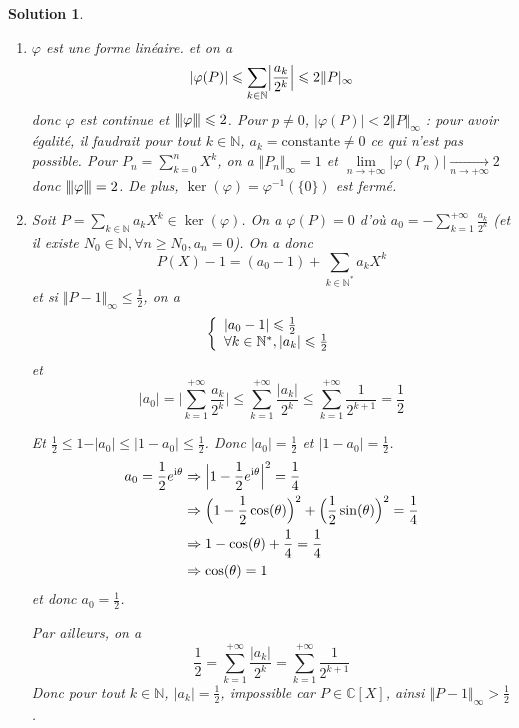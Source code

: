 \documentclass[12pt]{article}
\newtheorem{solution}{Solution}[section]
\theoremstyle{remark}
\newcommand{\C}{\mathbb{C}} \newcommand{\Q}{\mathbb{Q}}
\newcommand{\N}{\mathbb{N}} \newcommand{\Z}{\mathbb{Z}}
\newcommand{\vertiii}[1]{{\left\vert\kern-0.25ex\left\vert\kern-0.25ex\left\vert{}#1
\right\vert\kern-0.25ex\right\vert\kern-0.25ex\right\vert}}
\begin{document}
\begin{solution}
	\phantom{}
	\begin{enumerate}
		\item $\varphi$ est une forme linéaire. et on a 
		$$\vert\varphi(P)\vert\leqslant\sum_{k\in\N}\Bigl\vert\frac{a_k}{2^{k}}\Bigr\vert\leqslant2\Vert P\vert_{\infty}$$
		donc $\varphi$ est continue et $\vertiii{\varphi}\leqslant2$. Pour $p\neq0$, $\vert\varphi(P)\vert<2\Vert P\Vert_{\infty}$ : pour avoir égalité, il faudrait pour tout $k\in\N$, $a_{k}=\text{constante}\neq0$ ce qui n'est pas possible. Pour $P_{n}=\sum_{k=0}^{n}X^{k}$, on a $\Vert P_{n}\Vert_{\infty}=1$ et $\lim\limits_{n\to+\infty}\vert\varphi(P_{n})\vert\xrightarrow[n\to+\infty]{}2$ donc $\vertiii{\varphi}=2$. De plus, $\ker(\varphi)=\varphi^{-1}(\{0\})$ est fermé.

		\item Soit $P=\sum_{k\in\N}a_{k}X^{k}\in\ker(\varphi)$. On a $\varphi(P)=0$ d'où $a_{0}=-\sum_{k=1}^{+\infty}\frac{a_{k}}{2^{k}}$ (et il existe $N_{0}\in\N,\forall n\geqslant N_{0},a_{n}=0$). On a donc 
		$$P(X)-1=(a_{0}-1)+\sum_{k\in\N^{*}}a_{k}X^{k}$$
		et si $\Vert P-1\Vert_{\infty}\leqslant\frac{1}{2}$, on a 
		$$
		\left\{
			\begin{array}[]{l}
				\vert a_{0}-1\vert\leqslant\frac{1}{2}\\
				\forall k\in\N^{*},\vert a_{k}\vert\leqslant\frac{1}{2}
			\end{array}
		\right.
		$$
		et 
		$$\vert a_{0}\vert=\Biggl\vert\sum_{k=1}^{+\infty}\frac{a_{k}}{2^{k}}\Biggr\vert\leqslant\sum_{k=1}^{+\infty}\frac{\vert a_{k}\vert}{2^{k}}\leqslant\sum_{k=1}^{+\infty}\frac{1}{2^{k+1}}=\frac{1}{2}$$

		Et $\frac{1}{2}\leqslant 1-\vert a_{0}\vert\leqslant\vert 1-a_{0}\vert\leqslant\frac{1}{2}$. Donc $\vert a_{0}\vert=\frac{1}{2}$ et $\vert 1-a_{0}\vert=\frac{1}{2}$.
		\begin{align*}
			a_{0}=\frac{1}{2}e^{\mathrm{i}\theta}
			&\Rightarrow \Bigl\vert 1-\frac{1}{2}e^{\mathrm{i}\theta}\Bigr\vert^{2}=\frac{1}{4}\\
			&\Rightarrow \Bigl(1-\frac{1}{2}\cos(\theta)\Bigr)^{2}+\Bigl(\frac{1}{2}\sin(\theta)\Bigr)^{2}=\frac{1}{4}\\
			&\Rightarrow 1-\cos(\theta)+\frac{1}{4}=\frac{1}{4}\\
			&\Rightarrow \cos(\theta)=1
		\end{align*}
		et donc $a_{0}=\frac{1}{2}$.

		Par ailleurs, on a 
		$$\frac{1}{2}=\sum_{k=1}^{+\infty}\frac{\vert a_{k}\vert}{2^{k}}=\sum_{k=1}^{+\infty}\frac{1}{2^{k+1}}$$
		Donc pour tout $k\in\N$, $\vert a_{k}\vert=\frac{1}{2}$, impossible car $P\in\C[X]$, ainsi $\Vert P-1\Vert_{\infty}>\frac{1}{2}$.


\end{enumerate}
\end{solution}
\end{document}
